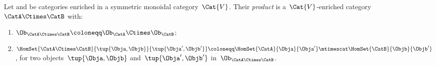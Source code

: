\begin{definition}
	\label{def:prod_enrich_cat}
	Let \CatA and \CatB be categories enriched in a symmetric monoidal category~$\Cat{V}$.
	Their \emph{product} is a~$\Cat{V}$-enriched category~$\CatA\Ctimes \CatB$ with:
	\begin{enumerate}
		\item $\Ob_{\CatA\Ctimes \CatB}\coloneqq \Ob_\CatA \Ctimes \Ob_\CatB$;
		\item $\HomSet{\CatA\Ctimes \CatB}{\tup{\Obja,\Objb}}{\tup{\Obja',\Objb'}}\coloneqq \HomSet{\CatA}{\Obja}{\Obja'}\mtimescat \HomSet{\CatB}{\Objb}{\Objb'}$, for two objects~$\tup{\Obja,\Objb}$ and~$\tup{\Obja',\Objb'}$ in~$\Ob_{\CatA\Ctimes \CatB}$.
	\end{enumerate}
\end{definition}


